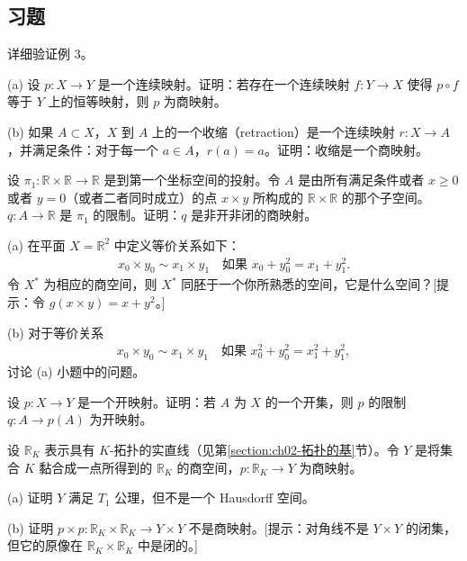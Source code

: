 \documentclass[../../main.tex]{subfiles}
\begin{document}
\subsection*{习题}

\begin{exercise}\label{exercise:ch02-商拓扑-1}
详细验证例 3。
\end{exercise}

\begin{exercise}\label{exercise:ch02-商拓扑-2}
(a) 设 $p: X \rightarrow Y$ 是一个连续映射。证明：若存在一个连续映射 $f: Y \rightarrow X$ 使得 $p \circ f$ 等于 $Y$ 上的恒等映射，则 $p$ 为商映射。

(b) 如果 $A \subset X$，$X$ 到 $A$ 上的一个收缩（retraction）是一个连续映射 $r: X \rightarrow A$，并满足条件：对于每一个 $a \in A$，$r(a) = a$。证明：收缩是一个商映射。
\end{exercise}

\begin{exercise}\label{exercise:ch02-商拓扑-3}
设 $\pi_{1}: \mathbb{R} \times \mathbb{R} \rightarrow \mathbb{R}$ 是到第一个坐标空间的投射。令 $A$ 是由所有满足条件或者 $x \geqslant 0$ 或者 $y = 0$（或者二者同时成立）的点 $x \times y$ 所构成的 $\mathbb{R} \times \mathbb{R}$ 的那个子空间。$q: A \rightarrow \mathbb{R}$ 是 $\pi_{1}$ 的限制。证明：$q$ 是非开非闭的商映射。
\end{exercise}

\begin{exercise}\label{exercise:ch02-商拓扑-4}
(a) 在平面 $X = \mathbb{R}^{2}$ 中定义等价关系如下：
\begin{align*}
x_{0} \times y_{0} \sim x_{1} \times y_{1} \quad \text{如果 } x_{0} + y_{0}^{2} = x_{1} + y_{1}^{2}.
\end{align*}
令 $X^{*}$ 为相应的商空间，则 $X^{*}$ 同胚于一个你所熟悉的空间，它是什么空间？[提示：令 $g(x \times y) = x + y^{2}$。]

(b) 对于等价关系
\begin{align*}
x_{0} \times y_{0} \sim x_{1} \times y_{1} \quad \text{如果 } x_{0}^{2} + y_{0}^{2} = x_{1}^{2} + y_{1}^{2},
\end{align*}
讨论 (a) 小题中的问题。
\end{exercise}

\begin{exercise}\label{exercise:ch02-商拓扑-5}
设 $p: X \rightarrow Y$ 是一个开映射。证明：若 $A$ 为 $X$ 的一个开集，则 $p$ 的限制 $q: A \rightarrow p(A)$ 为开映射。
\end{exercise}

\begin{exercise}\label{exercise:ch02-商拓扑-6}
设 $\mathbb{R}_{K}$ 表示具有 $K$-拓扑的实直线（见第\cref{section:ch02-拓扑的基}节）。令 $Y$ 是将集合 $K$ 黏合成一点所得到的 $\mathbb{R}_{K}$ 的商空间，$p: \mathbb{R}_{K} \rightarrow Y$ 为商映射。

(a) 证明 $Y$ 满足 $T_{1}$ 公理，但不是一个 Hausdorff 空间。

(b) 证明 $p \times p: \mathbb{R}_{K} \times \mathbb{R}_{K} \rightarrow Y \times Y$ 不是商映射。[提示：对角线不是 $Y \times Y$ 的闭集，但它的原像在 $\mathbb{R}_{K} \times \mathbb{R}_{K}$ 中是闭的。]
\end{exercise}
\end{document}
